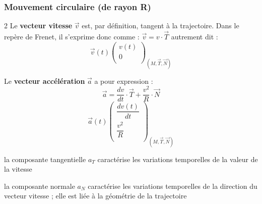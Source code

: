 \documentclass[a4paper,11pt,fleqn]{article}%
\begin{document}
		\subsubsection*{Mouvement circulaire (de rayon R)}
\begin{multicols}{2}
		Le \textbf{vecteur vitesse} $\vec{v}$ est, par définition, tangent à la trajectoire. Dans le repère de Frenet, il s'exprime donc comme : $\vec{v} = v \cdot \vec{T}$ autrement dit :
		$$\vec{v}(t) \left(
			\begin{array}{c}
			v(t)\\
			0\\			
			\end{array}
			\right)_{(M,\vec{T},\vec{N})}$$
			
Le \textbf{vecteur accélération} $\vec{a}$ a pour expression :
	$$\vec{a}=\dfrac{dv}{dt} \cdot \vec{T}+ \dfrac{v^2}{R}\cdot \vec{N}$$
			$$\vec{a}(t) \left(
			\begin{array}{c}
			\dfrac{dv(t)}{dt}\\
			\dfrac{v^2}{R}\\			
			\end{array}
			\right)_{(M,\vec{T},\vec{N})}$$


\noindent
{}	
			
		\begin{itemize*}
			\item la composante tangentielle $a_T$ caractérise les variations temporelles de la valeur de la vitesse
			\item la composante normale $a_N$ caractérise les variations temporelles de la direction du vecteur vitesse ; elle est liée à la géométrie de la trajectoire
		\end{itemize*}

\end{multicols}
		
\end{document}
